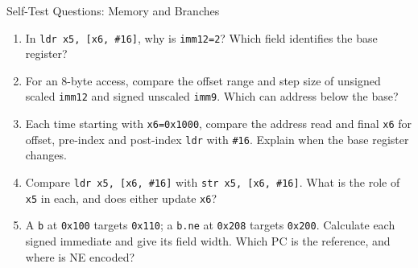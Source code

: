\documentclass[aspectratio=169,11pt,t]{beamer}
\newcommand{\hex}[1]{\texttt{0x#1}}
\newcommand{\code}[1]{\texttt{#1}}
\begin{document}

\begin{frame}{Self-Test Questions: Memory and Branches}
\small
{}
\begin{enumerate}\setlength{\itemsep}{8pt}
\item In \code{ldr x5, [x6, \#16]}, why is \code{imm12=2}? Which field identifies the base register?
\item For an 8-byte access, compare the offset range and step size of unsigned scaled \code{imm12} and signed unscaled \code{imm9}. Which can address below the base?
\item Each time starting with \code{x6=0x1000}, compare the address read and final \code{x6} for offset, pre-index and post-index \code{ldr} with \code{\#16}. Explain when the base register changes.
\item Compare \code{ldr x5, [x6, \#16]} with \code{str x5, [x6, \#16]}. What is the role of \code{x5} in each, and does either update \code{x6}?
\item A \code{b} at \hex{100} targets \hex{110}; a \code{b.ne} at \hex{208} targets \hex{200}. Calculate each signed immediate and give its field width. Which PC is the reference, and where is NE encoded?
\end{enumerate}
\end{frame}




\end{document}
